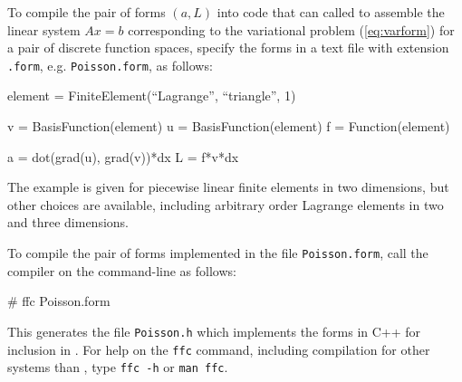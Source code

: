 To compile the pair of forms $(a, L)$ into code that can called to
assemble the linear system $A x = b$ corresponding to the variational
problem (\ref{eq:varform}) for a pair of discrete function spaces,
specify the forms in a text file with extension \texttt{.form},
e.g. \texttt{Poisson.form}, as follows:
\begin{code}
  element = FiniteElement(``Lagrange'', ``triangle'', 1)

  v = BasisFunction(element)
  u = BasisFunction(element)
  f = Function(element)
  
  a = dot(grad(u), grad(v))*dx
  L = f*v*dx
\end{code}

The example is given for piecewise linear finite elements in two
dimensions, but other choices are available, including arbitrary order
Lagrange elements in two and three dimensions.

To compile the pair of forms implemented in the file
\texttt{Poisson.form}, call the compiler on the command-line as
follows:
\begin{code}
  # ffc Poisson.form
\end{code}
This generates the file \texttt{Poisson.h} which implements the forms
in C++ for inclusion in \dolfin{}. For help on the \texttt{ffc}
command, including compilation for other systems than \dolfin{}, type
\texttt{ffc -h} or \texttt{man ffc}.
